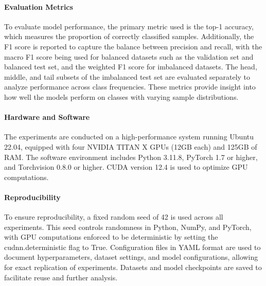 \paragraph{Evaluation Metrics}
To evaluate model performance, the primary metric used is the top-1 accuracy, which measures the proportion of correctly classified samples. Additionally, the F1 score is reported to capture the balance between precision and recall, with the macro F1 score being used for balanced datasets such as the validation set and balanced test set, and the weighted F1 score for imbalanced datasets. The head, middle, and tail subsets of the imbalanced test set are evaluated separately to analyze performance across class frequencies. These metrics provide insight into how well the models perform on classes with varying sample distributions.

\paragraph{Hardware and Software}
The experiments are conducted on a high-performance system running Ubuntu 22.04, equipped with four NVIDIA TITAN X GPUs (12GB each) and 125GB of RAM. The software environment includes Python 3.11.8, PyTorch 1.7 or higher, and Torchvision 0.8.0 or higher. CUDA version 12.4 is used to optimize GPU computations.

\paragraph{Reproducibility}
To ensure reproducibility, a fixed random seed of 42 is used across all experiments. This seed controls randomness in Python, NumPy, and PyTorch, with GPU computations enforced to be deterministic by setting the cudnn.deterministic flag to True. Configuration files in YAML format are used to document hyperparameters, dataset settings, and model configurations, allowing for exact replication of experiments. Datasets and model checkpoints are saved to facilitate reuse and further analysis.


